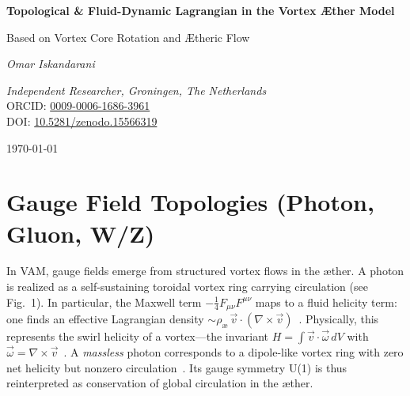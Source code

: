 \documentclass[a4paper,12pt]{article}
\begin{document}
    \begin{titlepage}
        \thispagestyle{empty}
        \centering
        \vspace*{2cm}
        {\Huge\bfseries Topological \& Fluid-Dynamic Lagrangian in the Vortex Æther Model \par}
        \vspace{0.5cm}
        {\Large Based on Vortex Core Rotation and Ætheric Flow \par}
        \vspace{2cm}
        {\Large\itshape Omar Iskandarani\par}
        \vspace{0.5cm}
        \textit{Independent Researcher, Groningen, The Netherlands} \\
        ORCID: \href{https://orcid.org/0009-0006-1686-3961}{0009-0006-1686-3961} \\
        DOI: \href{https://doi.org/10.5281/zenodo.15566319}{10.5281/zenodo.15566319} \\
        \vfill
        {\large \today\par}


        \begin{abstract}
            This document presents a Lagrangian formulation for the Vortex Æther Model (VAM), focusing on the topological and fluid-dynamic aspects of particle interactions. It introduces a path-integral approach to quantize vorticity, linking it to gauge theory and relativity corrections. The model posits that particles like electrons and protons are represented as vortex knots in an incompressible æther, with their dynamics governed by a Lagrangian that incorporates both topological stability and fluid flow characteristics.
        \end{abstract}

    \end{titlepage}

    \newpage

\chapter*{Gauge Field Topologies (Photon, Gluon, W/Z)}

In VAM, gauge fields emerge from structured vortex flows in the æther. A photon is realized as a self-sustaining toroidal vortex ring carrying circulation (see Fig.~1). In particular, the Maxwell term $-\tfrac{1}{4} F_{\mu\nu}F^{\mu\nu}$ maps to a fluid helicity term: one finds an effective Lagrangian density $\sim \rho_{æ}\,\vec{v}\cdot(\nabla\times \vec{v})$~\cite{vam-lagrangian}. Physically, this represents the swirl helicity of a vortex---the invariant $H=\int \vec{v}\cdot\vec{\omega}\,dV$ with $\vec{\omega}=\nabla\times\vec{v}$~\cite{vam-helicity}. A \textit{massless} photon corresponds to a dipole-like vortex ring with zero net helicity but nonzero circulation~\cite{vam-helicity}. Its gauge symmetry U(1) is thus reinterpreted as conservation of global circulation in the æther.
\end{document}
